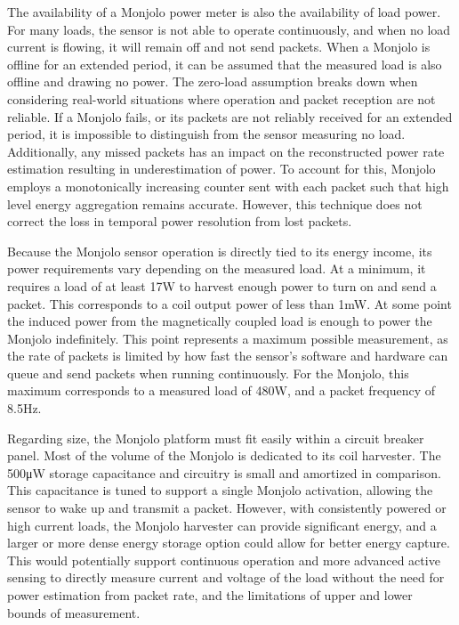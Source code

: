 The availability of a Monjolo power meter is also the availability of load power. For many loads, the sensor is not able to operate continuously, and when no load current is flowing, it will remain off and not send packets. 
When a Monjolo is offline for an extended period, it can be assumed that the measured load is also offline and drawing no power.
The zero-load assumption breaks down when considering real-world situations where operation and packet reception are not reliable.
If a Monjolo fails, or its packets are not reliably received for an extended period, it is impossible to distinguish from the sensor measuring no load. 
Additionally, any missed packets has an impact on the reconstructed power rate estimation resulting in underestimation of power. 
To account for this, Monjolo employs a monotonically increasing counter sent with each packet such that high level energy aggregation remains accurate. 
However, this technique does not correct the loss in temporal power resolution from lost packets. 

Because the Monjolo sensor operation is directly tied to its energy income, its power requirements vary depending on the measured load. At a minimum, it requires a load of at least 17\si{\watt} to harvest enough power to turn on and send a packet. This corresponds to a coil output power of less than 1\si{\milli\watt}. At some point the induced power from the magnetically coupled load is enough to power the Monjolo indefinitely. This point represents a maximum possible measurement, as the rate of packets is limited by how fast the sensor's software and hardware can queue and send packets when running continuously. For the Monjolo, this maximum corresponds to a measured load of 480\si{\watt}, and a packet frequency of 8.5\si{\hertz}.

Regarding size, the Monjolo platform must fit easily within a circuit breaker panel. Most of the volume of the Monjolo is dedicated to its coil harvester.
The 500\si{\micro\watt} storage capacitance and circuitry is small and amortized in comparison.
This capacitance is tuned to support a single Monjolo activation, allowing the sensor to wake up and transmit a packet.
However, with consistently powered or high current loads, the Monjolo harvester can provide significant energy, and a larger or more dense energy storage option could allow for better energy capture. This would potentially support continuous operation and more advanced active sensing to directly measure current and voltage of the load without the need for power estimation from packet rate, and the limitations of upper and lower bounds of measurement. 

